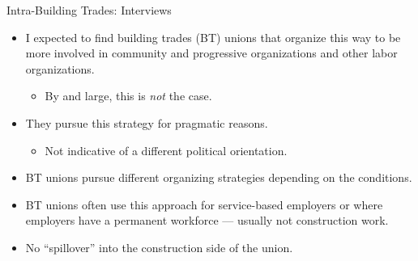 \documentclass{beamer}
\begin{document}
\begin{frame}{Intra-Building Trades: Interviews}
	\begin{itemize}
		\item I expected to find building trades (BT) unions that organize this way to be more involved in community and progressive organizations and other labor organizations.
		\begin{itemize}
			\item By and large, this is \emph{not} the case.
		\end{itemize}
		\item They pursue this strategy for pragmatic reasons.
		\begin{itemize}
			\item Not indicative of a different political orientation.
		\end{itemize}
		\item BT unions pursue different organizing strategies depending on the conditions.
		\item BT unions often use this approach for service-based employers or where employers have a permanent workforce — usually not construction work.
		\item No “spillover” into the construction side of the union.
	\end{itemize}
\end{frame}



\end{document}
